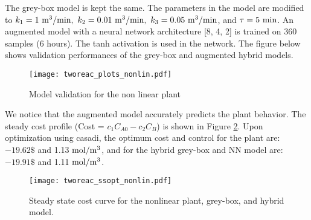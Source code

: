 \documentclass{article}
\begin{document}
The grey-box model is kept the same. The parameters 
in the model are modified to 
$k_1 = 1 \ \textnormal{m}^3/\textnormal{min}, 
\ k_2 = 0.01 \ \textnormal{m}^3/\textnormal{min},
\ k_3 = 0.05 \ \textnormal{m}^3/\textnormal{min}$, 
and $\tau = 5 \ \textnormal{min}$.
An augmented model with a neural
network architecture [8, 4, 2] is trained on 360 samples (6 hours). 
The tanh activation is used in the network. The figure below shows 
validation performances of the grey-box and augmented 
hybrid models.

\begin{figure}[!h]
  \centering
  \texttt{[image: tworeac\_plots\_nonlin.pdf]}
  \caption{Model validation for the non linear plant}
  \label{fig:validation_nonlinear}
\end{figure}

We notice that the augmented model accurately predicts the plant 
behavior. The steady cost profile (Cost = $c_1C_{A0} - c_2C_B$)
is shown in Figure \ref{fig:cost_nonlinear}. Upon optimization 
using casadi, the optimum cost and control for the plant are: $-19.62 \$$ 
and 1.13 $\textnormal{mol}/\textnormal{m}^3$, and for the hybrid 
grey-box and NN model are: $-19.91 \$$ 
and 1.11 $\textnormal{mol}/\textnormal{m}^3$.


\begin{figure}[!h]
  \centering
  \texttt{[image: tworeac\_ssopt\_nonlin.pdf]}
  \caption{Steady state cost curve for the nonlinear plant, grey-box, and hybrid model.}
  \label{fig:cost_nonlinear}
\end{figure}

\end{document}
